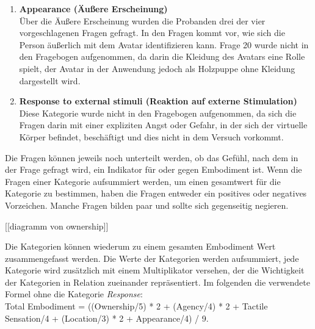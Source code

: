 \begin{enumerate}
\item\textbf{Appearance (Äußere Erscheinung)}\\
Über die Äußere Erscheinung wurden die Probanden drei der vier vorgeschlagenen Fragen gefragt. In den Fragen kommt vor, wie sich die Person äußerlich mit dem Avatar identifizieren kann. Frage 20 wurde nicht in den Fragebogen aufgenommen, da darin die Kleidung des Avatars eine Rolle spielt, der Avatar in der Anwendung jedoch als Holzpuppe ohne Kleidung dargestellt wird.

\item\textbf{Response to external stimuli (Reaktion auf externe Stimulation)}\\
Diese Kategorie wurde nicht in den Fragebogen aufgenommen, da sich die Fragen darin mit einer expliziten Angst oder Gefahr, in der sich der virtuelle Körper befindet, beschäftigt und dies nicht in dem Versuch vorkommt.

\end{enumerate}

Die Fragen können jeweils noch unterteilt werden, ob das Gefühl, nach dem in der Frage gefragt wird, ein Indikator für oder gegen Embodiment ist. Wenn die Fragen einer Kategorie aufsummiert werden, um einen gesamtwert für die Kategorie zu bestimmen, haben die Fragen entweder ein positives oder negatives Vorzeichen. Manche Fragen bilden paar und sollte sich gegenseitig negieren. 

[[diagramm von ownership]]

Die Kategorien können wiederum zu einem gesamten Embodiment Wert zusammengefasst werden. Die Werte der Kategorien werden aufsummiert, jede Kategorie wird zusätzlich mit einem Multiplikator versehen, der die Wichtigkeit der Kategorien in Relation zueinander repräsentiert. Im folgenden die verwendete Formel ohne die Kategorie \textit{Response}:\\
Total Embodiment = ((Ownership/5) * 2 + (Agency/4) * 2 + Tactile Sensation/4 + (Location/3) * 2 + Appearance/4) / 9.








